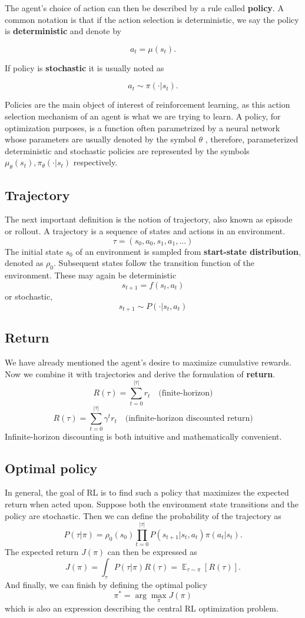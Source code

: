The agent's choice of action can then be described by a rule called \textbf{policy}. 
A common notation is that if the action selection is deterministic, we say the policy is \textbf{deterministic} and denote by

$$
a_t = \mu(s_t).
$$

If policy is \textbf{stochastic} it is usually noted as 

$$a_t \sim \pi(\cdot |s_t).$$

Policies are the main object of interest of reinforcement learning, as this action selection mechanism of an agent is what we are trying to learn.
A policy, for optimization purposes, is a function often parametrized by a neural network whose parameters are usually denoted by the symbol
$
    \theta
$
, therefore, parameterized deterministic and stochastic policies are represented by the symbols     $\mu_\theta(s_t) , \pi_\theta(\cdot |s_t)$ respectively.

\subsection*{Trajectory}
The next important definition is the notion of trajectory, also known as episode or rollout.
A trajectory is a sequence of states and actions in an environment.
$$\tau = (s_0, a_0, s_1, a_1, ...)$$
The initial state $s_0$ of an environment is sampled from \textbf{start-state distribution}, denoted as $\rho_0$. 
Subsequent states follow the transition function of the environment. 
These may again be deterministic 
$$s_{t+1} = f(s_t, a_t)$$ or stochastic,
$$s_{t+1} \sim P(\cdot | s_t, a_t)$$

\subsection*{Return}
We have already mentioned the agent's desire to maximize cumulative rewards.
Now we combine it with trajectories and derive the formulation of \textbf{return}.
$$R(\tau) = \sum_{t=0}^{|\tau|}r_t \quad \textrm{(finite-horizon)} $$
$$R(\tau) = \sum_{t=0}^{|\tau|}\gamma^t r_t \quad \textrm{(infinite-horizon discounted return)} $$
Infinite-horizon discounting is both intuitive and mathematically convenient.



\subsection*{Optimal policy}
In general, the goal of RL is to find such a policy that maximizes the expected return when acted upon.
Suppose both the environment state transitions and the policy are stochastic. 
Then we can define the probability of the trajectory as
$$P(\tau|\pi) = \rho_0(s_0) \prod_{t=0}^{|\tau|} P(s_{t+1}|s_t,a_t)\pi(a_t|s_t).$$
The expected return $J(\pi)$ can then be expressed as
$$J(\pi)=\int_\tau P(\tau|\pi)R(\tau)= \mathop{\mathbb{E}}_{\tau \sim \pi}[R(\tau)].$$
And finally, we can finish by defining the optimal policy 
$$\pi^* = \arg \max_\pi J(\pi)$$
which is also an expression describing the central RL optimization problem.

